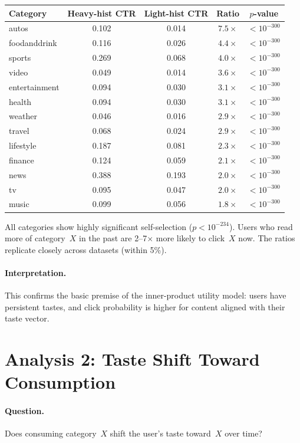 \documentclass[11pt]{article}
\begin{document}
\begin{center}
\begin{tabular}{lcccc}
\toprule
Category & Heavy-hist CTR & Light-hist CTR & Ratio & $p$-value \\
\midrule
autos & 0.102 & 0.014 & $7.5\times$ & $< 10^{-300}$ \\
foodanddrink & 0.116 & 0.026 & $4.4\times$ & $< 10^{-300}$ \\
sports & 0.269 & 0.068 & $4.0\times$ & $< 10^{-300}$ \\
video & 0.049 & 0.014 & $3.6\times$ & $< 10^{-300}$ \\
entertainment & 0.094 & 0.030 & $3.1\times$ & $< 10^{-300}$ \\
health & 0.094 & 0.030 & $3.1\times$ & $< 10^{-300}$ \\
weather & 0.046 & 0.016 & $2.9\times$ & $< 10^{-300}$ \\
travel & 0.068 & 0.024 & $2.9\times$ & $< 10^{-300}$ \\
lifestyle & 0.187 & 0.081 & $2.3\times$ & $< 10^{-300}$ \\
finance & 0.124 & 0.059 & $2.1\times$ & $< 10^{-300}$ \\
news & 0.388 & 0.193 & $2.0\times$ & $< 10^{-300}$ \\
tv & 0.095 & 0.047 & $2.0\times$ & $< 10^{-300}$ \\
music & 0.099 & 0.056 & $1.8\times$ & $< 10^{-300}$ \\
\bottomrule
\end{tabular}
\end{center}

All categories show highly significant self-selection ($p < 10^{-234}$). Users who read more of category~$X$ in the past are 2--7$\times$ more likely to click~$X$ now. The ratios replicate closely across datasets (within 5\%).

\paragraph{Interpretation.} This confirms the basic premise of the inner-product utility model: users have persistent tastes, and click probability is higher for content aligned with their taste vector.

\section{Analysis 2: Taste Shift Toward Consumption}

\paragraph{Question.} Does consuming category~$X$ shift the user's taste toward~$X$ over time?
\end{document}
